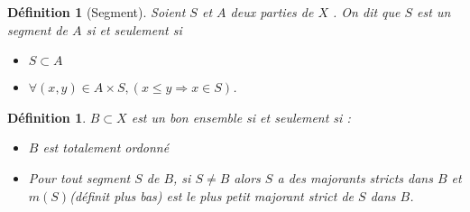 \documentclass[12pt,a4paper]{amsart}
\newtheorem{defn}[thm]{\bf D\'efinition}
\begin{document}
\begin{defn}[Segment]
Soient $S$ et $A$ deux parties de $X$ . On dit que $S$ est un segment de $A$ si et seulement si 

\begin{itemize}
\item $S\subset A$
\item $\forall (x,y) \in A \times S, (x\leq y \Rightarrow x\in S)$.
\end{itemize}
\end{defn}



\begin{defn}
$B \subset X$ est un bon ensemble si et seulement si : 
\begin{itemize}
\item $B$ est totalement ordonné
\item Pour tout segment $S$ de $B$, si $S\neq B$ alors $S$ a des majorants stricts dans $B$ et $m(S)$(définit plus bas) est le plus petit majorant strict de $S$ dans $B$. 
\end{itemize}

\end{defn}
\end{document}
